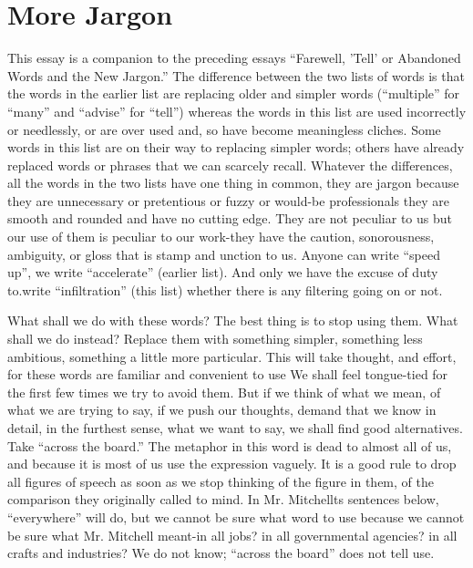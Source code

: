 \documentclass[
    oneside,
    11pt,
    draft
]{memoir}
\begin{document}
\chapter{More Jargon}
This essay is a companion to the preceding essays \enquote{Farewell, 'Tell' or Abandoned Words and the New Jargon.} The difference between the two lists of words is that the words in the earlier list are replacing older and simpler words (\enquote{multiple} for \enquote{many} and \enquote{advise} for \enquote{tell}) whereas the words in this list are used incorrectly or needlessly, or are over used and, so have become meaningless cliches. Some words in this list are on their way to replacing simpler words; others have already replaced words or phrases that we can scarcely recall. Whatever the differences, all the words in the two lists have one thing in common, they are jargon because they are unnecessary or pretentious or fuzzy or would-be professionals they are smooth and rounded and have no cutting edge. They are not peculiar to us but our use of them is peculiar to our work-they have the caution, sonorousness, ambiguity, or gloss that is stamp and unction to us. Anyone can write \enquote{speed up}, we write \enquote{accelerate} (earlier list). And only we have the excuse of duty to.write \enquote{infiltration} (this list) whether there is any filtering going on or not.

What shall we do with these words? The best thing is to stop using them. What shall we do instead? Replace them with something simpler, something less ambitious, something a little more particular. This will take thought, and effort, for these words are familiar and convenient to use We shall feel tongue-tied for the first few times we try to avoid them. But if we think of what we mean, of what we are trying to say, if we push our thoughts, demand that we know in detail, in the furthest sense, what we want to say, we shall find good alternatives. Take \enquote{across the board.} The metaphor in this word is dead to almost all of us, and because it is most of us use the expression vaguely. It is a good rule to drop all figures of speech as soon as we stop thinking of the figure in them, of the comparison they originally called to mind. In Mr. Mitchellts sentences below, \enquote{everywhere} will do, but we cannot be sure what word to use because we cannot be sure what Mr. Mitchell meant-in all jobs? in all governmental agencies? in all crafts and industries? We do not know; \enquote{across the board} does not tell use.
\end{document}
